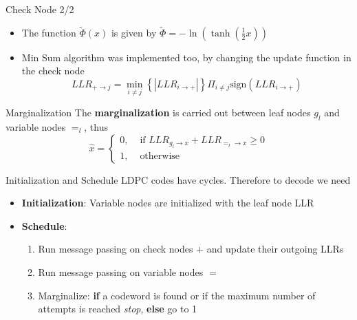\documentclass[pdf]
          {beamer}
\newlength\fheight
\newlength\fwidth
\begin{document}
\begin{frame}{Check Node 2/2}
	\begin{itemize}
		\item The function $\tilde{\Phi} (x) $ is given by
				$
					\tilde{\Phi} = - \ln \left( \tanh \left(\frac{1}{2} x\right)\right)
				$
				\begin{figure}[t]
					\centering
					\setlength{}
					\setlength{}
					
					\label{fig:info_uni}
				\end{figure}
		\item Min Sum algorithm was implemented too, by changing the update function in the check node
			$$
				LLR_{+\rightarrow j} = \min_{i \ne j} \left\{ |LLR_{i \rightarrow +}| \right\} \Pi_{i \ne j} \mbox{sign} \left( LLR_{i \rightarrow +} \right)
			$$
	\end{itemize}

\end{frame}

\begin{frame}{Marginalization}
	The \textbf{marginalization} is carried out between leaf nodes $g_l$ and variable nodes $=_l$, thus
	$$
		\hat{x} =
		\begin{cases}
			0, &\text{ if }LLR_{g_l \rightarrow x} + LLR_{=_l \rightarrow x} \ge 0\\
			1, &\text{ otherwise }
		\end{cases}
	$$
\end{frame}

\begin{frame}{Initialization and Schedule}
	LDPC codes have cycles. Therefore to decode we need
	\begin{itemize}
		\item \textbf{Initialization}: Variable nodes are initialized with the leaf node LLR
		\item \textbf{Schedule}: 
		\begin{enumerate}
			\item Run message passing on check nodes $+$ and update their outgoing LLRs
			\item Run message passing on variable nodes $=$
			\item Marginalize: \textbf{if} a codeword is found or if the maximum number of attempts is reached \textit{stop}, \textbf{else} go to 1
		\end{enumerate}
	\end{itemize}
\end{frame}
\end{document}
